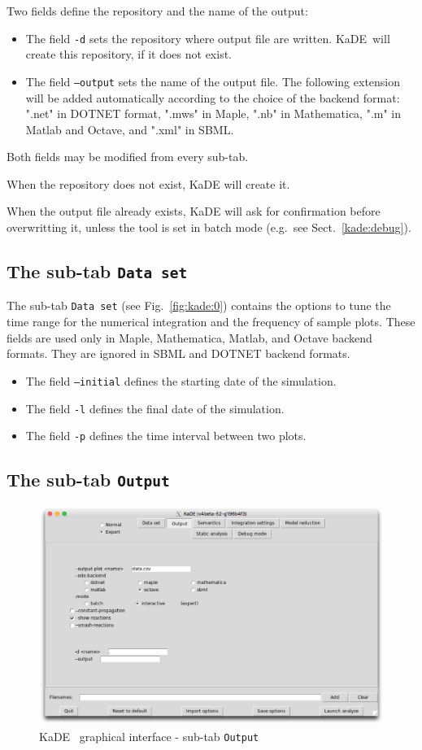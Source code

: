 \documentclass[11pt]{book}
\def\KaDE{\textsf{KaDE}}
\begin{document}
Two fields define the repository and the name of the output:
\begin{itemize}
\item The field \texttt{-d} sets  the repository where output file are written. \KaDE~will create this repository, if it does not exist.
\item The field \texttt{--output} sets the name of the output file.
The following extension will be added automatically according to the choice of the backend format: ".net" in DOTNET format, ".mws" in Maple, ".nb" in Mathematica, ".m" in Matlab and Octave, and ".xml" in SBML.
\end{itemize}
Both fields may be modified from every sub-tab.

When the repository does not exist, {\KaDE} will create it.

When the output file already exists, {\KaDE} will ask for confirmation before overwritting it, unless the tool is set in batch mode (e.g.~see Sect.~\ref{kade:debug}).

\subsection{The sub-tab \texttt{Data set}}

The sub-tab \texttt{Data set} (see Fig.~\ref{fig:kade:0}) contains the options to tune the time range for the numerical integration and the frequency of sample plots. These fields are used only in Maple, Mathematica, Matlab, and Octave backend formats.
They are ignored in SBML and DOTNET backend formats.
\begin{itemize}
\item The field \texttt{--initial} defines the starting date of the simulation.
\item The field \texttt{-l} defines the final date of the simulation.
\item The field \texttt{-p} defines the time interval between two plots.
\end{itemize}

\subsection{The sub-tab \texttt{Output}}

\begin{figure}[htbp]
\centering
\includegraphics[width=12cm,bb=0 0 1904 1208]{img/kade_1.png}
\caption{\KaDE~ graphical interface - sub-tab \texttt{Output}}
\label{fig:kade:1}
\end{figure}
\end{document}
